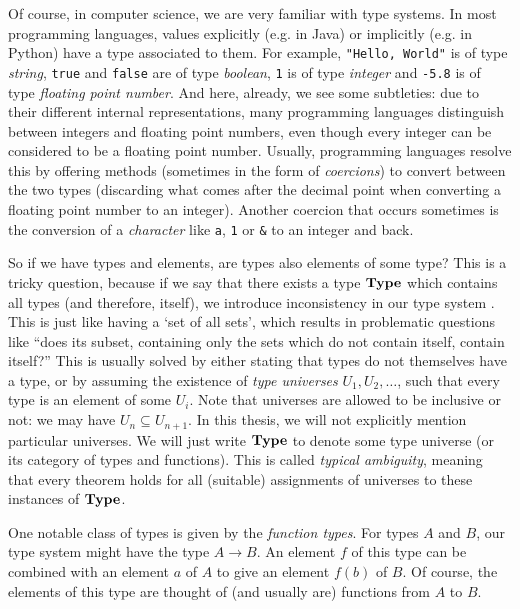 Of course, in computer science, we are very familiar with type systems. In most programming languages, values explicitly (e.g. in Java) or implicitly (e.g. in Python) have a type associated to them. For example, \texttt{"Hello, World"} is of type \textit{string}, \texttt{true} and \texttt{false} are of type \textit{boolean}, \texttt{1} is of type \textit{integer} and \texttt{-5.8} is of type \textit{floating point number}. And here, already, we see some subtleties: due to their different internal representations, many programming languages distinguish between integers and floating point numbers, even though every integer can be considered to be a floating point number. Usually, programming languages resolve this by offering methods (sometimes in the form of \textit{coercions}) to convert between the two types (discarding what comes after the decimal point when converting a floating point number to an integer). Another coercion that occurs sometimes is the conversion of a \textit{character} like \texttt{a}, \texttt{1} or \texttt{\&} to an integer and back.

So if we have types and elements, are types also elements of some type? This is a tricky question, because if we say that there exists a type $ \mathbf{Type} $ which contains all types (and therefore, itself), we introduce inconsistency in our type system \autocite{girard}. This is just like having a `set of all sets', which results in problematic questions like ``does its subset, containing only the sets which do not contain itself, contain itself?'' This is usually solved by either stating that types do not themselves have a type, or by assuming the existence of \textit{type universes} $ U_1, U_2, \dots $, such that every type is an element of some $ U_i $. Note that universes are allowed to be inclusive or not: we may have $ U_n \subseteq U_{n + 1} $. In this thesis, we will not explicitly mention particular universes. We will just write $ \mathbf{Type} $ to denote some type universe (or its category of types and functions). This is called \textit{typical ambiguity}, meaning that every theorem holds for all (suitable) assignments of universes to these instances of $ \mathbf{Type} $.

One notable class of types is given by the \textit{function types}. For types $ A $ and $ B $, our type system might have the type $ A \to B $. An element $ f $ of this type can be combined with an element $ a $ of $ A $ to give an element $ f(b) $ of $ B $. Of course, the elements of this type are thought of (and usually are) functions from $ A $ to $ B $.

